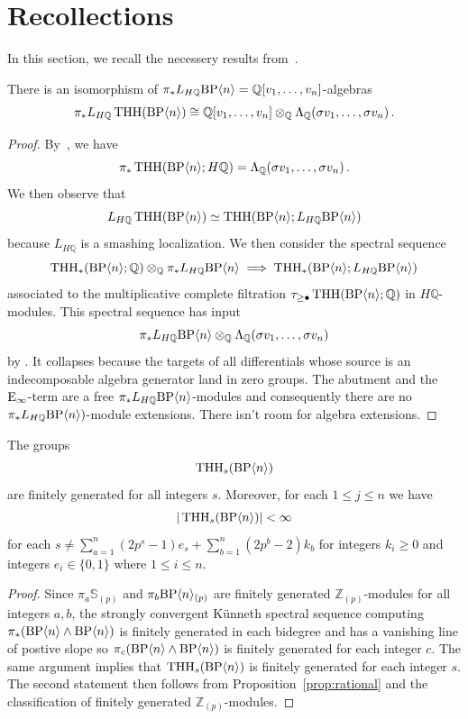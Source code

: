 \section{Recollections}
In this section, we recall the necessery results from~\cite{AKCH24}. 

\begin{proposition}\label{prop:rational}
There is an isomorphism of $\pi_{*}L_{H\mathbb{Q}}\mathrm{BP}\langle n\rangle=\mathbb{Q}[v_{1},\dots ,v_{n}]$-algebras
\[ \pi_{*}L_{H\mathbb{Q}}\operatorname{THH}(\mathrm{BP}\langle n\rangle )\cong\mathbb{Q}[v_{1},\dots ,v_{n}]\otimes_{\mathbb{Q}} \Lambda_{\mathbb{Q}} (\sigma v_{1},\dots ,\sigma v_{n}) \,.\]
\end{proposition}
\begin{proof}
By~\cite[Proposition~3.7]{AKCH24}, we have
\[ 
\pi_{*}\operatorname{THH}(\mathrm{BP}\langle n\rangle;H\mathbb{Q} )=\Lambda_{\mathbb{Q}} (\sigma v_{1},\dots ,\sigma v_{n})\,.\]
We then observe that 
\[L_{H\mathbb{Q}}\operatorname{THH}(\mathrm{BP}\langle n\rangle )\simeq \operatorname{THH}(\mathrm{BP}\langle n\rangle;L_{H\mathbb{Q}}\mathrm{BP}\langle n\rangle )\]
because $L_{H\mathbb{Q}}$ is a smashing localization. We then consider the spectral sequence 
\[
\operatorname{THH}_{*}(\mathrm{BP}\langle n\rangle;\mathbb{Q})\otimes_{\mathbb{Q}} \pi_{*}L_{H\mathbb{Q}}\mathrm{BP}\langle n\rangle\implies \operatorname{THH}_{*}(\mathrm{BP}\langle n\rangle;L_{H\mathbb{Q}}\mathrm{BP}\langle n\rangle)
\]
associated to the multiplicative complete filtration $\tau_{\ge \bullet}\operatorname{THH}(\mathrm{BP}\langle n\rangle;\mathbb{Q})$ in $H\mathbb{Q}$-modules. This spectral sequence has input 
\[ \pi_{*}L_{H\mathbb{Q}}\mathrm{BP}\langle n\rangle\otimes_{\mathbb{Q}} \Lambda_{\mathbb{Q}} (\sigma v_{1},\dots ,\sigma v_{n})\]
by \cite[Proposition~3.7]{AKCH24}. It collapses because the targets of all differentials whose source is an indecomposable algebra generator land in zero groups. The abutment and the $\mathrm{E}_{\infty}$-term are a free $\pi_{*}L_{H\mathbb{Q}}\mathrm{BP}\langle n\rangle$-modules and consequently there are no $\pi_{*}L_{H\mathbb{Q}}\mathrm{BP}\langle n\rangle)$-module extensions. There isn't room for algebra extensions. 
\end{proof}

\begin{proposition}
The groups 
\[ 
\operatorname{THH}_{s}(\mathrm{BP}\langle n\rangle )
\]
are finitely generated for all integers $s$. Moreover, for each $1\le j\le n$ we have 
\[
|\operatorname{THH}_{s}(\mathrm{BP}\langle n\rangle )|<\infty
\]
for each $s\ne \sum_{a=1}^n(2p^s-1)e_s+\sum_{b=1}^n(2p^b-2)k_b$ for integers $k_i\ge 0$ and integers $e_i\in \{0,1\}$ where $1\le i\le n$. 
\end{proposition}
\begin{proof}
Since $\pi_{a}\mathbb{S}_{(p)}$ and $\pi_{b}\mathrm{BP}\langle n\rangle_{(p)}$ are finitely generated $\mathbb{Z}_{(p)}$-modules for all integers $a,b$, the strongly convergent K\"unneth spectral sequence computing $\pi_{*}(\mathrm{BP}\langle n\rangle\wedge \mathrm{BP}\langle n\rangle)$ is finitely generated in each bidegree and has a vanishing line of postive slope so $\pi_{c}(\mathrm{BP}\langle n\rangle\wedge \mathrm{BP}\langle n\rangle)$ is finitely generated for each integer $c$. The same argument implies that $\operatorname{THH}_{s}(\mathrm{BP}\langle n\rangle)$ is finitely generated for each integer $s$. The second statement then follows from Proposition~\ref{prop:rational} and the classification of finitely generated $\mathbb{Z}_{(p)}$-modules. 
\end{proof}